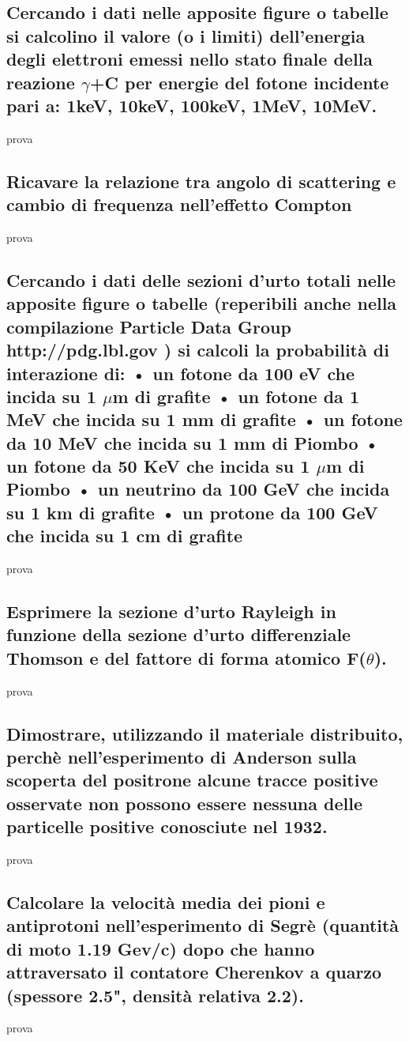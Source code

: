\subsection[]{Cercando i dati nelle apposite figure o tabelle si calcolino il valore (o i limiti) dell'energia degli elettroni emessi nello stato finale della reazione $\gamma$+C per energie del fotone incidente pari a: 1keV, 10keV, 100keV, 1MeV, 10MeV.
}prova
\label{sec:4.b.21}
\subsection[]{Ricavare la relazione tra angolo di scattering e cambio di frequenza nell'effetto Compton
}prova
\label{sec:4.b.22}
\subsection[]{Cercando i dati delle sezioni d’urto totali nelle apposite figure o tabelle (reperibili anche nella compilazione Particle Data Group http://pdg.lbl.gov ) si calcoli la probabilità di interazione di:
• un fotone da 100 eV che incida su 1 $\mu$m di grafite
• un fotone da 1 MeV che incida su 1 mm di grafite
• un fotone da 10 MeV che incida su 1 mm di Piombo
• un fotone da 50 KeV che incida su 1 $\mu$m di Piombo
• un neutrino da 100 GeV che incida su 1 km di grafite
• un protone da 100 GeV che incida su 1 cm di grafite
}prova
\label{sec:4.b.23}
\subsection[]{Esprimere la sezione d'urto Rayleigh in funzione della sezione d'urto differenziale Thomson e del fattore di forma atomico F($\theta$).
}prova
\label{sec:4.b.24}
\subsection[]{Dimostrare, utilizzando il materiale distribuito, perchè nell’esperimento di Anderson sulla scoperta del positrone alcune tracce positive osservate non
possono essere nessuna delle particelle positive conosciute nel 1932.
}prova
\label{sec:4.b.25}
\subsection[]{Calcolare la velocità media dei pioni e antiprotoni nell'esperimento di Segrè (quantità di moto 1.19 Gev/c) dopo che hanno attraversato il contatore Cherenkov a quarzo (spessore 2.5", densità relativa 2.2).
}prova
\label{sec:4.b.26}
